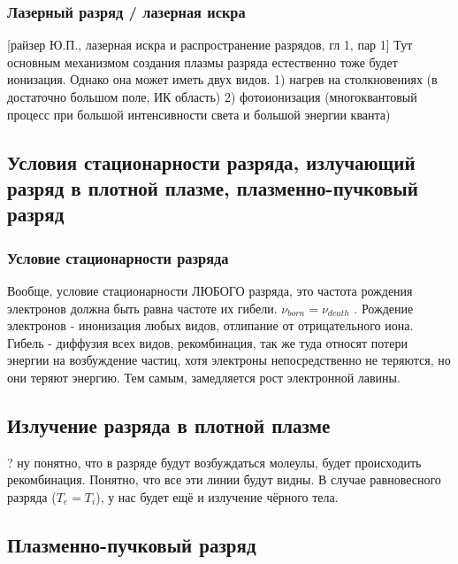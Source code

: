 \documentclass[10pt, a4paper]{article}
\numberwithin{equation}{section}
\begin{document}
\subsubsection{Лазерный разряд / лазерная искра}
[райзер Ю.П., лазерная искра и распространение разрядов, гл 1, пар 1]
Тут основным механизмом создания плазмы разряда естественно тоже будет ионизация. Однако она может иметь двух видов. 1) нагрев на столкновениях (в достаточно большом поле, ИК область) 2) фотоионизация (многоквантовый процесс при большой интенсивности света и большой энергии кванта)

\subsection{Условия стационарности разряда, излучающий разряд в плотной плазме, плазменно-пучковый разряд}
\subsubsection{Условие стационарности разряда}

Вообще, условие стационарности ЛЮБОГО разряда,  это частота рождения электронов должна быть равна частоте их гибели. $\nu_{born} = \nu_{death}$ . Рождение электронов - инонизация любых видов, отлипание от отрицательного иона. Гибель - диффузия всех видов, рекомбинация, так же туда относят потери энергии на возбуждение частиц, хотя электроны непосредственно не теряются, но они теряют энергию. Тем самым, замедляется рост электронной лавины. 

\subsection{Излучение разряда в плотной плазме}

?
ну понятно, что в разряде будут возбуждаться молеулы, будет происходить рекомбинация. Понятно, что все эти линии будут видны. В случае равновесного разряда ($T_e = T_i$), у нас будет ещё и излучение чёрного тела.

\subsection{Плазменно-пучковый разряд}
\end{document}
